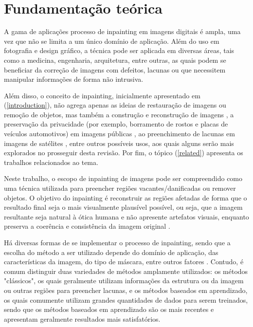 
\section{Fundamentação teórica}

A gama de aplicações processo de inpainting em imagens digitais é ampla, uma vez que não se limita a um único domínio de aplicação. Além do uso em fotografia e design gráfico, a técnica pode ser aplicada em diversas áreas, tais como a medicina, engenharia, arquitetura, entre outras, as quais podem se beneficiar da correção de imagens com defeitos, lacunas ou que necessitem manipular informações de forma não intrusiva.

Além disso, o conceito de inpainting, inicialmente apresentado em (\ref{introduction}), não agrega apenas as ideias de restauração de imagens ou remoção de objetos, mas também a construção e reconstrução de imagens \cite{you2019pirec}, a preservação da privacidade (por exemplo, borramento de rostos e placas de veículos automotivos) em imagens públicas \cite{google2022magritte}, ao preenchimento de lacunas em imagens de satélites \cite{Maalouf2009bandelet}, entre outros possíveis usos, aos quais alguns serão mais explorados no prosseguir desta revisão. Por fim, o tópico (\ref{related}) apresenta os trabalhos relacionados ao tema. 

Neste trabalho, o escopo de inpainting de imagens pode ser compreendido como uma técnica utilizada para preencher regiões vacantes/danificadas ou remover objetos. O objetivo do inpainting é reconstruir as regiões afetadas de forma que o resultado final seja o mais visualmente plausível possível, ou seja, que a imagem resultante seja natural à ótica humana e não apresente artefatos visuais, enquanto preserva a coerência e consistência da imagem original \cite{levin2003learning}.

Há diversas formas de se implementar o processo de inpainting, sendo que a escolha do método a ser utilizado depende do domínio de aplicação, das características da imagem, do tipo de máscara, entre outros fatores \cite{black2020evaluation}. Contudo, é comum distinguir duas variedades de métodos amplamente utilizados: os métodos "clássicos", os quais geralmente utilizam informações da estrutura ou da imagem ou outras regiões para preencher lacunas, e os métodos baseados em aprendizado, os quais comumente utilizam grandes quantidades de dados para serem treinados, sendo que os métodos baseados em aprendizado são os mais recentes e apresentam geralmente resultados mais satisfatórios.


